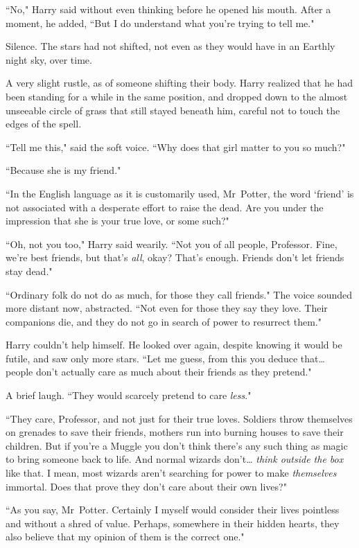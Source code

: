 ``No," Harry said without even thinking before he opened his mouth. After a moment, he added, ``But I do understand what you're trying to tell me."

Silence. The stars had not shifted, not even as they would have in an Earthly night sky, over time.

A very slight rustle, as of someone shifting their body. Harry realized that he had been standing for a while in the same position, and dropped down to the almost unseeable circle of grass that still stayed beneath him, careful not to touch the edges of the spell.

``Tell me this," said the soft voice. ``Why does that girl matter to you so much?"

``Because she is my friend."

``In the English language as it is customarily used, Mr~Potter, the word `friend' is not associated with a desperate effort to raise the dead. Are you under the impression that she is your true love, or some such?"

``Oh, not you too," Harry said wearily. ``Not you of all people, Professor. Fine, we're best friends, but that's \emph{all}, okay? That's enough. Friends don't let friends stay dead."

``Ordinary folk do not do as much, for those they call friends." The voice sounded more distant now, abstracted. ``Not even for those they say they love. Their companions die, and they do not go in search of power to resurrect them."

Harry couldn't help himself. He looked over again, despite knowing it would be futile, and saw only more stars. ``Let me guess, from this you deduce that{\ldots} people don't actually care as much about their friends as they pretend."

A brief laugh. ``They would scarcely pretend to care \emph{less}."

``They care, Professor, and not just for their true loves. Soldiers throw themselves on grenades to save their friends, mothers run into burning houses to save their children. But if you're a Muggle you don't think there's any such thing as magic to bring someone back to life. And normal wizards don't{\ldots} \emph{think outside the box} like that. I mean, most wizards aren't searching for power to make \emph{themselves} immortal. Does that prove they don't care about their own lives?"

``As you say, Mr~Potter. Certainly I myself would consider their lives pointless and without a shred of value. Perhaps, somewhere in their hidden hearts, they also believe that my opinion of them is the correct one."

